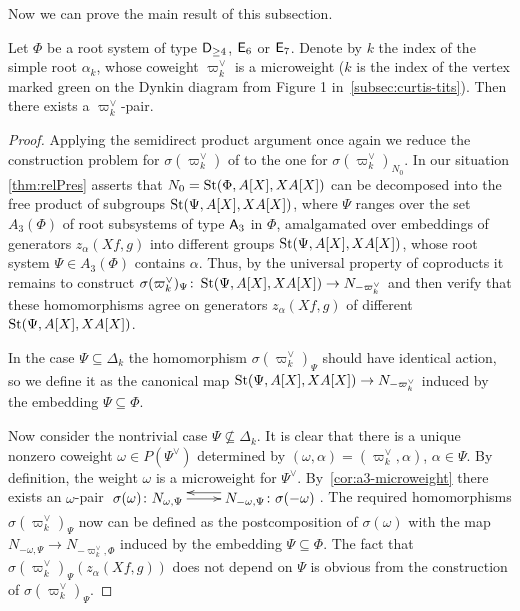 Now we can prove the main result of this subsection.
\begin{thm} \label{thm:pairconstr}
    Let $\Phi$ be a root system of type $\mathsf{D}_{\geq 4}$, $\mathsf{E}_6$ or $\mathsf{E}_7$.
    Denote by $k$ the index of the simple root $\alpha_k$, whose coweight $\varpi_k^\vee$ is a microweight
     ($k$ is the index of the vertex marked green on the Dynkin diagram from Figure 1 in~\cref{subsec:curtis-tits}).
    Then there exists a $\varpi_k^\vee$-pair.
\end{thm}
\begin{proof}
    Applying the semidirect product argument once again we reduce the construction problem for $\sigma(\varpi_k^\vee)$ of to the one for $\sigma({\varpi_k^\vee})_{N_0}$.
    In our situation \cref{thm:relPres} asserts that $N_0 = \operatorname{St}(\Phi, A[X], XA[X])$ can be decomposed into the free product of subgroups $\operatorname{St}(\Psi, A[X], XA[X])$,
    where $\Psi$ ranges over the set $A_3(\Phi)$ of root subsystems of type $\mathsf{A}_3$ in $\Phi$, amalgamated over embeddings of generators $z_\alpha(Xf, g)$ into different groups $\operatorname{St}(\Psi, A[X], XA[X])$, whose root system $\Psi \in A_3(\Phi)$ contains $\alpha$.
    Thus, by the universal property of coproducts it remains to construct $\sigma(\varpi_k^\vee)_\Psi \colon \operatorname{St}(\Psi, A[X], XA[X]) \to N_{-\varpi_k^\vee}$ and then
    verify that these homomorphisms agree on generators $z_\alpha(Xf, g)$ of different $\operatorname{St}(\Psi, A[X], XA[X])$.

    In the case $\Psi \subseteq \Delta_k$ the homomorphism $\sigma(\varpi_k^\vee)_\Psi$ should have identical action, so we define it as the canonical map $\operatorname{St}(\Psi, A[X], XA[X]) \to N_{-\varpi_k^\vee}$
    induced by the embedding $\Psi \subseteq \Phi$.

    Now consider the nontrivial case $\Psi \not\subseteq \Delta_k$.
    It is clear that there is a unique nonzero coweight $\omega \in P(\Psi^\vee)$ determined by $(\omega, \alpha) = (\varpi_k^\vee, \alpha)$, $\alpha \in \Psi$.
    By definition, the weight $\omega$ is a microweight for $\Psi^\vee$.
    By~\cref{cor:a3-microweight} there exists an $\omega$-pair $\xymatrix{ \sigma(\omega)\colon N_{\omega, \Psi} \ar[r] & \ar@<-1.0ex>[l] N_{-\omega, \Psi}\colon \sigma(-\omega) }$.
    The required homomorphisms $\sigma(\varpi_k^\vee)_\Psi$ now can be defined as the postcomposition of $\sigma(\omega)$ with the map $N_{-\omega, \Psi} \to N_{-\varpi_k^\vee, \Phi}$ induced by the embedding $\Psi \subseteq \Phi$.
    The fact that $\sigma(\varpi_k^\vee)_\Psi(z_\alpha(Xf, g))$ does not depend on $\Psi$ is obvious from the construction of $\sigma(\varpi_k^\vee)_\Psi$.
\end{proof}